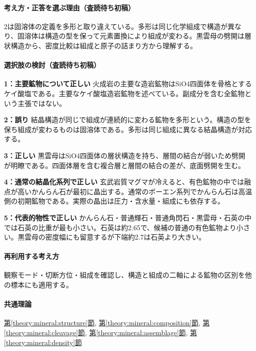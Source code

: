 \paragraph{考え方・正答を選ぶ理由（査読待ち初稿）} 2は固溶体の定義を多形と取り違えている。多形は同じ化学組成で構造が異なり、固溶体は構造の型を保って元素置換により組成が変わる。黒雲母の劈開は層状構造から、密度比較は組成と原子の詰まり方から理解する。

\paragraph{選択肢の検討（査読待ち初稿）}\mbox{}\par

\noindent\textbf{1：主要鉱物について正しい} 火成岩の主要な造岩鉱物はSiO4四面体を骨格とするケイ酸塩である。主要なケイ酸塩造岩鉱物を述べている。副成分を含む全鉱物という主張ではない。\par

\noindent\textbf{2：誤り} 結晶構造が同じで組成が連続的に変わる鉱物を多形という。構造の型を保ち組成が変わるものは固溶体である。多形は同じ組成に異なる結晶構造が対応する。\par

\noindent\textbf{3：正しい} 黒雲母はSiO4四面体の層状構造を持ち、層間の結合が弱いため劈開が明瞭である。四面体層を含む複合層と層間の結合の差が、底面劈開を生む。\par

\noindent\textbf{4：通常の結晶化系列で正しい} 玄武岩質マグマが冷えると、有色鉱物の中では融点が高いかんらん石が最初に晶出する。通常のボーエン系列でかんらん石は高温側の初期鉱物である。実際の晶出は圧力・含水量・組成にも依存する。\par

\noindent\textbf{5：代表的物性で正しい} かんらん石・普通輝石・普通角閃石・黒雲母・石英の中では石英の比重が最も小さい。石英は約2.65で、候補の普通の有色鉱物より小さい。黒雲母の密度幅にも留意するが下端約2.7は石英より大きい。\par

\paragraph{再利用する考え方} 観察モード・切断方位・組成を確認し、構造と組成の二軸による鉱物の区別を他の標本にも適用する。

\paragraph{共通理論} \hyperref[theory:mineral:structure]{第\ref*{theory:mineral:structure}節}, \hyperref[theory:mineral:composition]{第\ref*{theory:mineral:composition}節}, \hyperref[theory:mineral:cleavage]{第\ref*{theory:mineral:cleavage}節}, \hyperref[theory:mineral:assemblage]{第\ref*{theory:mineral:assemblage}節}, \hyperref[theory:mineral:density]{第\ref*{theory:mineral:density}節}

